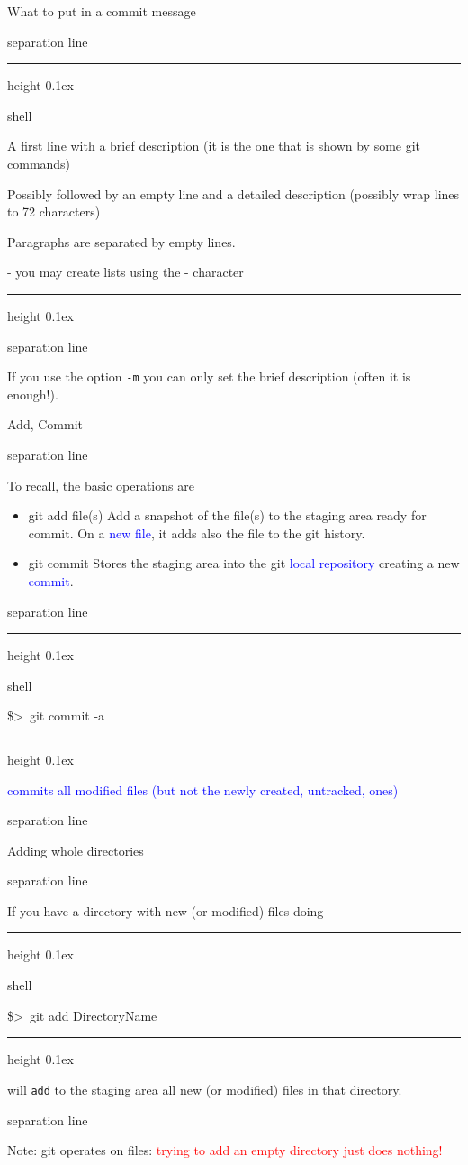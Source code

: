 \documentclass[hyperref={colorlinks}]{beamer}
\newenvironment{shell}{%
\footnotesize\flushleft\hrule height 0.1ex
\tt\begin{beamercolorbox}[sep=1ex,left]{shell}%
}{%
\end{beamercolorbox}
\hrule height 0.1ex
\endflushleft\par
}
\newcommand*{\psone}[1][ant]{\$>~}
\newcommand{\titleline}[1][0.025cm]{%
\begin{beamercolorbox}[wd=\paperwidth,ht=#1,center]{separation line}%
\end{beamercolorbox}%
}
\begin{document}
\begin{frame}{What to put in a commit message}
\titleline
\begin{shell}
A first line with a brief description (it is the one that is shown by some git commands)\\
\vspace{0.3cm}

Possibly followed by an empty line and a detailed description (possibly wrap lines to 72 characters)\\
\vspace{0.3cm}
 
Paragraphs are separated by empty lines.\\
\vspace{0.3cm}
 
- you may create lists using the - character
\end{shell}
\titleline
If you use the option \texttt{-m} \alert{you can only set the brief description} (often it is enough!).
\end{frame}

\begin{frame}{Add, Commit}
  \vspace*{-0.3cm}
\titleline
To recall, the basic operations are
\begin{itemize}
\item \alert{git add file(s)} Add a snapshot of the file(s) to the staging area ready for commit. On a \textcolor{blue}{new file}, it adds also the file to the git history.
\item \alert{git commit} Stores the staging area into the git \textcolor{blue}{local repository} creating a new \textcolor{blue}{commit}.
\end{itemize}
\titleline

\begin{shell}
\psone git commit -a 
\end{shell}
\textcolor{blue}{commits all modified files (but not the newly created, untracked, ones)}
\titleline
\end{frame}


\begin{frame}{Adding whole directories}
\titleline
If you have a directory with new (or modified) files doing

\begin{shell}
\psone git add DirectoryName
\end{shell} 
will \texttt{add} to the staging area all new (or modified) files in that directory.
\titleline

\alert{Note:} git operates on files: \textcolor{red}{trying to add an empty directory just does nothing!}
\end{frame}
\end{document}
